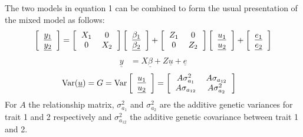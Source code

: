 \documentclass[12pt,a4paper]{paper}
\DeclareMathOperator{\var}{Var}
\begin{document}
The two models in equation 1 can be combined to form the usual presentation of the mixed model as follows:
\begin{equation}
\begin{split}
\left[\begin{tabular}{c}$\underline{y_{1}}$\\$\underline{y_{2}}$\end{tabular}\right] &= \left[\begin{tabular}{cc}$X_{1}$&0\\0&$X_{2}$\end{tabular}\right]\left[\begin{tabular}{c}$\underline{\beta_{1}}$\\$\underline{\beta_{2}}$\end{tabular}\right]+\left[\begin{tabular}{cc}$Z_{1}$&0\\0&$Z_{2}$\end{tabular}\right]\left[\begin{tabular}{c}$\underline{u_{1}}$\\$\underline{u_{2}}$\end{tabular}\right]+\left[\begin{tabular}{c}$\underline{e_{1}}$\\$\underline{e_{2}}$\end{tabular}\right]\\
\end{split}
\end{equation}
\begin{equation}
\begin{split}
\underline{y} &= X\underline{\beta} + Z\underline{u} + \underline{e}
\end{split}
\end{equation}
\begin{equation}
\begin{split}
\var(\underline{u}) &=  G = \var\left[\begin{tabular}{c}$\underline{u_{1}}$\\$\underline{u_{2}}$\end{tabular}\right] = \left[\begin{tabular}{cc}$A\sigma^{2}_{a_{1}}$&$A\sigma_{a_{12}}$\\$A\sigma_{a_{12}}$&$A\sigma^{2}_{a_{2}}$\end{tabular}\right]
\end{split}
\end{equation}
For $A$ the relationship matrix, $\sigma^{2}_{a_1}$ and $\sigma^{2}_{a_2}$ are the additive genetic variances for trait 1 and 2 respectively and $\sigma^{2}_{a_{12}}$ the additive genetic covariance between trait 1 and 2.
\end{document}
